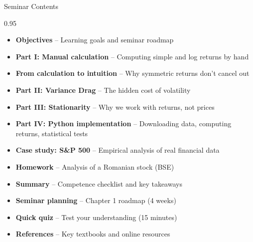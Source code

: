\documentclass[9pt, aspectratio=169, t]{beamer}
\subtitle{Seminar 1: Returns and Stationarity}
\begin{document}
{
\begin{frame}
    \titlepage
\end{frame}
}

\begin{frame}{Seminar Contents}
    \begin{cminipage}{0.95\textwidth}
    \begin{itemize}\setlength{\itemsep}{0pt}
        \item \textbf{Objectives} -- Learning goals and seminar roadmap
        \vspace{0.15cm}
        \item \textbf{Part I: Manual calculation} -- Computing simple and log returns by hand
        \vspace{0.15cm}
        \item \textbf{From calculation to intuition} -- Why symmetric returns don't cancel out
        \vspace{0.15cm}
        \item \textbf{Part II: Variance Drag} -- The hidden cost of volatility
        \vspace{0.15cm}
        \item \textbf{Part III: Stationarity} -- Why we work with returns, not prices
        \vspace{0.15cm}
        \item \textbf{Part IV: Python implementation} -- Downloading data, computing returns, statistical tests
        \vspace{0.15cm}
        \item \textbf{Case study: S\&P 500} -- Empirical analysis of real financial data
        \vspace{0.15cm}
        \item \textbf{Homework} -- Analysis of a Romanian stock (BSE)
        \vspace{0.15cm}
        \item \textbf{Summary} -- Competence checklist and key takeaways
        \vspace{0.15cm}
        \item \textbf{Seminar planning} -- Chapter 1 roadmap (4 weeks)
        \vspace{0.15cm}
        \item \textbf{Quick quiz} -- Test your understanding (15 minutes)
        \vspace{0.15cm}
        \item \textbf{References} -- Key textbooks and online resources
    \end{itemize}
    \end{cminipage}
\end{frame}
\end{document}
